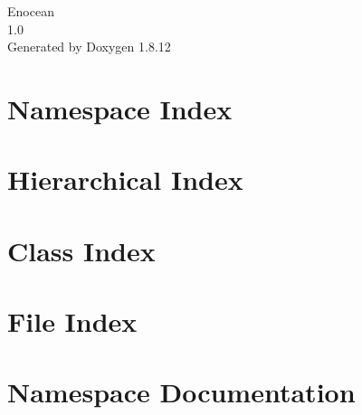 \documentclass[twoside]{book}
\newcommand{\+}{\discretionary{\mbox{\scriptsize$\hookleftarrow$}}{}{}}
\newcommand{\clearemptydoublepage}{%
  \newpage{\pagestyle{empty}\cleardoublepage}%
}
\begin{document}
\begin{titlepage}
\vspace*{7cm}
\begin{center}%
{\Large Enocean \\[1ex]\large 1.\+0 }\\
\vspace*{1cm}
{\large Generated by Doxygen 1.8.12}\\
\end{center}
\end{titlepage}
\clearemptydoublepage
{}
\tableofcontents
\clearemptydoublepage
{}

\chapter{Namespace Index}

\chapter{Hierarchical Index}

\chapter{Class Index}

\chapter{File Index}

\chapter{Namespace Documentation}









\end{document}
